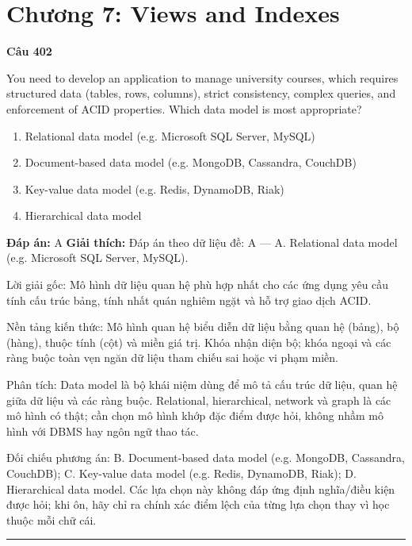 \documentclass[11pt,a4paper]{article}
\newenvironment{question}[1]{%
  \par\vspace{1em}\noindent\textbf{\large Câu #1}\par\vspace{0.4em}
}{%
  \par\vspace{1em}\hrule\vspace{0.6em}
}
\newenvironment{choices}{%
  \begin{enumerate}[label=\textbf{\Alph*.},leftmargin=2.2em,itemsep=2pt,topsep=3pt]
}{%
  \end{enumerate}
}
\newcommand{\choice}{\item}
\begin{document}
\newpage
\section*{Chương 7: Views and Indexes}


\begin{question}{402}
You need to develop an application to manage university courses, which requires structured data (tables, rows, columns), strict consistency, complex queries, and enforcement of ACID properties. Which data model is most appropriate?
\begin{choices}
\choice Relational data model (e.g. Microsoft SQL Server, MySQL)
\choice Document-based data model (e.g. MongoDB, Cassandra, CouchDB)
\choice Key-value data model (e.g. Redis, DynamoDB, Riak)
\choice Hierarchical data model
\end{choices}
\textbf{Đáp án:} A
\textbf{Giải thích:} Đáp án theo dữ liệu đề: A — A. Relational data model (e.g. Microsoft SQL Server, MySQL).

Lời giải gốc: Mô hình dữ liệu quan hệ phù hợp nhất cho các ứng dụng yêu cầu tính cấu trúc bảng, tính nhất quán nghiêm ngặt và hỗ trợ giao dịch ACID.

Nền tảng kiến thức: Mô hình quan hệ biểu diễn dữ liệu bằng quan hệ (bảng), bộ (hàng), thuộc tính (cột) và miền giá trị. Khóa nhận diện bộ; khóa ngoại và các ràng buộc toàn vẹn ngăn dữ liệu tham chiếu sai hoặc vi phạm miền.

Phân tích: Data model là bộ khái niệm dùng để mô tả cấu trúc dữ liệu, quan hệ giữa dữ liệu và các ràng buộc. Relational, hierarchical, network và graph là các mô hình có thật; cần chọn mô hình khớp đặc điểm được hỏi, không nhầm mô hình với DBMS hay ngôn ngữ thao tác.

Đối chiếu phương án: B. Document-based data model (e.g. MongoDB, Cassandra, CouchDB); C. Key-value data model (e.g. Redis, DynamoDB, Riak); D. Hierarchical data model. Các lựa chọn này không đáp ứng định nghĩa/điều kiện được hỏi; khi ôn, hãy chỉ ra chính xác điểm lệch của từng lựa chọn thay vì học thuộc mỗi chữ cái.
\end{question}
\end{document}
